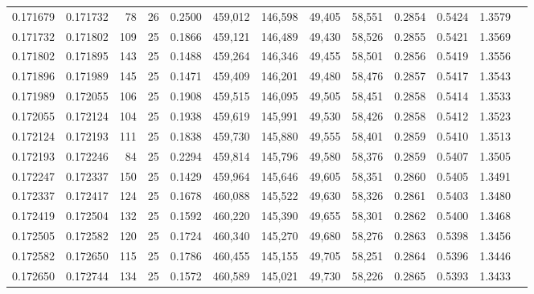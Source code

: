 \begin{tabular}{rrrrrrrrrrrrr}
0.171679 & 0.171732 &    78 &  26 &                                     0.2500 & 459,012 & 146,598 &  49,405 &  58,551 & 0.2854 & 0.5424 & 1.3579 \\
0.171732 & 0.171802 &   109 &  25 &                                     0.1866 & 459,121 & 146,489 &  49,430 &  58,526 & 0.2855 & 0.5421 & 1.3569 \\
0.171802 & 0.171895 &   143 &  25 &                                     0.1488 & 459,264 & 146,346 &  49,455 &  58,501 & 0.2856 & 0.5419 & 1.3556 \\
0.171896 & 0.171989 &   145 &  25 &                                     0.1471 & 459,409 & 146,201 &  49,480 &  58,476 & 0.2857 & 0.5417 & 1.3543 \\
0.171989 & 0.172055 &   106 &  25 &                                     0.1908 & 459,515 & 146,095 &  49,505 &  58,451 & 0.2858 & 0.5414 & 1.3533 \\
0.172055 & 0.172124 &   104 &  25 &                                     0.1938 & 459,619 & 145,991 &  49,530 &  58,426 & 0.2858 & 0.5412 & 1.3523 \\
0.172124 & 0.172193 &   111 &  25 &                                     0.1838 & 459,730 & 145,880 &  49,555 &  58,401 & 0.2859 & 0.5410 & 1.3513 \\
0.172193 & 0.172246 &    84 &  25 &                                     0.2294 & 459,814 & 145,796 &  49,580 &  58,376 & 0.2859 & 0.5407 & 1.3505 \\
0.172247 & 0.172337 &   150 &  25 &                                     0.1429 & 459,964 & 145,646 &  49,605 &  58,351 & 0.2860 & 0.5405 & 1.3491 \\
0.172337 & 0.172417 &   124 &  25 &                                     0.1678 & 460,088 & 145,522 &  49,630 &  58,326 & 0.2861 & 0.5403 & 1.3480 \\
0.172419 & 0.172504 &   132 &  25 &                                     0.1592 & 460,220 & 145,390 &  49,655 &  58,301 & 0.2862 & 0.5400 & 1.3468 \\
0.172505 & 0.172582 &   120 &  25 &                                     0.1724 & 460,340 & 145,270 &  49,680 &  58,276 & 0.2863 & 0.5398 & 1.3456 \\
0.172582 & 0.172650 &   115 &  25 &                                     0.1786 & 460,455 & 145,155 &  49,705 &  58,251 & 0.2864 & 0.5396 & 1.3446 \\
0.172650 & 0.172744 &   134 &  25 &                                     0.1572 & 460,589 & 145,021 &  49,730 &  58,226 & 0.2865 & 0.5393 & 1.3433 \\

\end{tabular}
